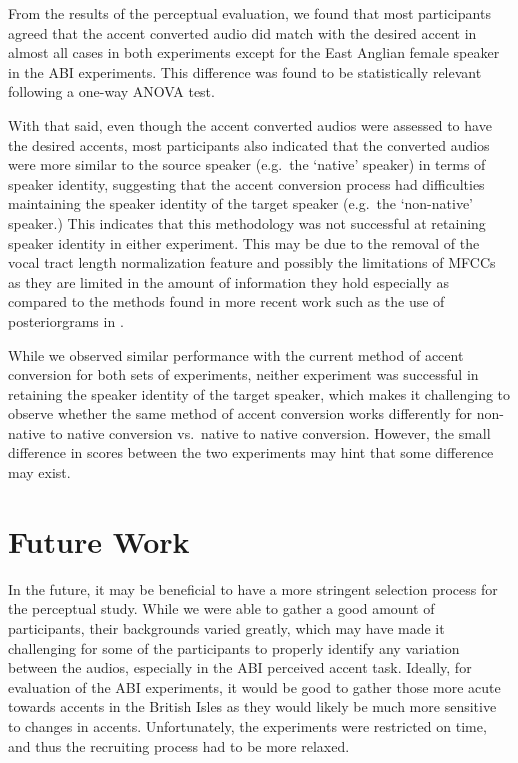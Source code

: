 \documentclass
[
    a4paper,
    twoside,
    12pt,
]
{report}
\begin{document}
From the results of the perceptual evaluation, we found that most
participants agreed that the accent converted audio did match with the
desired accent in almost all cases in both experiments except for the
East Anglian female speaker in the ABI experiments. This difference was
found to be statistically relevant following a one-way ANOVA test.

With that said, even though the accent converted audios were assessed to
have the desired accents, most participants also indicated that the
converted audios were more similar to the source speaker (e.g.~the
`native' speaker) in terms of speaker identity, suggesting that the
accent conversion process had difficulties maintaining the speaker
identity of the target speaker (e.g.~the `non-native' speaker.) This
indicates that this methodology was not successful at retaining speaker
identity in either experiment. This may be due to the removal of the
vocal tract length normalization feature and possibly the limitations of
MFCCs as they are limited in the amount of information they hold
especially as compared to the methods found in more recent work such as
the use of posteriorgrams in \textcite{zhao2018a}.

While we observed similar performance with the current method of accent
conversion for both sets of experiments, neither experiment was
successful in retaining the speaker identity of the target speaker,
which makes it challenging to observe whether the same method of accent
conversion works differently for non-native to native conversion
vs.~native to native conversion. However, the small difference in scores
between the two experiments may hint that some difference may exist.

\hypertarget{future-work}{%
\section{Future Work}\label{future-work}}

In the future, it may be beneficial to have a more stringent selection
process for the perceptual study. While we were able to gather a good
amount of participants, their backgrounds varied greatly, which may have
made it challenging for some of the participants to properly identify
any variation between the audios, especially in the ABI perceived accent
task. Ideally, for evaluation of the ABI experiments, it would be good
to gather those more acute towards accents in the British Isles as they
would likely be much more sensitive to changes in accents.
Unfortunately, the experiments were restricted on time, and thus the
recruiting process had to be more relaxed.
\end{document}
